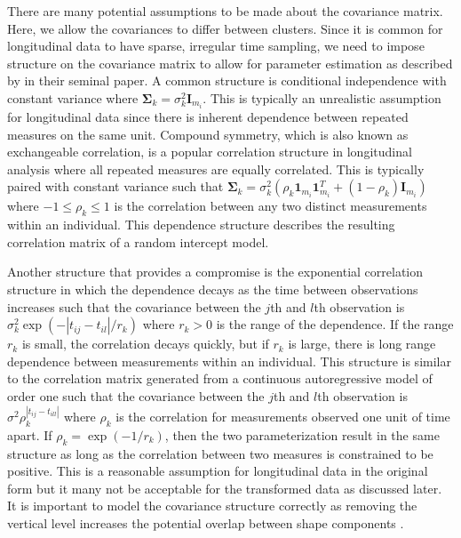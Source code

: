 \documentclass[12pt]{article}
\newcommand{\B}[0]{\mathbf}
\begin{document}
There are many potential assumptions to be made about the covariance matrix. Here, we allow the covariances to differ between clusters. Since it is common for longitudinal data to have sparse, irregular time sampling, we need to impose structure on the covariance matrix to allow for parameter estimation as described by \textcite{jennrich1986} in their seminal paper. A common structure is conditional independence with constant variance where $\B \Sigma_{k}= \sigma_{k}^{2}\B I_{m_{i}}$. This is typically an unrealistic assumption for longitudinal data since there is inherent dependence between repeated measures on the same unit. Compound symmetry, which is also known as exchangeable correlation, is a popular correlation structure in longitudinal analysis where all repeated measures are equally correlated. This is typically paired with constant variance such that $\B \Sigma_{k} = \sigma_{k}^{2}(\rho_{k}\B1_{m_{i}}\B1_{m_{i}}^{T}+(1-\rho_{k})\B I_{m_{i}})$ where $-1\leq\rho_{k}\leq 1$ is the correlation between any two distinct measurements within an individual. This dependence structure describes the resulting correlation matrix of a random intercept model.

Another structure that provides a compromise is the exponential correlation structure in which the dependence decays as the time between observations increases such that the covariance between the $j$th and $l$th observation is $\sigma_{k}^{2}\exp(-| t_{ij}-t_{il}| / r_{k})$ where $r_{k}> 0$ is the range of the dependence. If the range $r_{k}$ is small, the correlation decays quickly, but if $r_{k}$ is large, there is long range dependence between measurements within an individual. This structure is similar to the correlation matrix generated from a continuous autoregressive model of order one such that the covariance between the $j$th and $l$th observation is $\sigma^{2}\rho_{k}^{|t_{ij}-t_{ill}|}$ where $\rho_{k}$ is the correlation for measurements observed one unit of time apart. If $\rho_{k} = \exp(-1/r_{k})$, then the two parameterization result in the same structure as long as the correlation between two measures is constrained to be positive. This is a reasonable assumption for longitudinal data in the original form but it many not be acceptable for the transformed data as discussed later. It is important to model the covariance structure correctly as removing the vertical level increases the potential overlap between shape components \cite{heggeseth2013}. 
\end{document}
